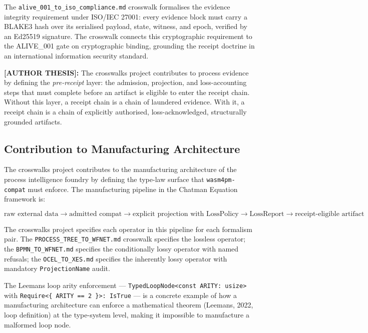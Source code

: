The \texttt{alive\_001\_to\_iso\_compliance.md} crosswalk formalises the evidence integrity
requirement under \textsc{ISO/IEC} 27001: every evidence block must carry a \textsc{BLAKE3}
hash over its serialised payload, state, witness, and epoch, verified by an Ed25519 signature.
The crosswalk connects this cryptographic requirement to the \textsc{ALIVE\_001} gate on
cryptographic binding, grounding the receipt doctrine in an international information security
standard.

\textbf{[AUTHOR THESIS]:} The crosswalks project contributes to process evidence by defining
the \emph{pre-receipt} layer: the admission, projection, and loss-accounting steps that must
complete before an artifact is eligible to enter the receipt chain. Without this layer, a
receipt chain is a chain of laundered evidence. With it, a receipt chain is a chain of
explicitly authorised, loss-acknowledged, structurally grounded artifacts.

\subsection{Contribution to Manufacturing Architecture}
\label{sec:crosswalks-contribution-manufacturing}

The crosswalks project contributes to the manufacturing architecture of the process intelligence
foundry by defining the type-law surface that \texttt{wasm4pm-compat} must enforce. The
manufacturing pipeline in the Chatman Equation framework is:

\[
  \text{raw external data}
  \to \text{admitted compat}
  \to \text{explicit projection with LossPolicy}
  \to \text{LossReport}
  \to \text{receipt-eligible artifact}
\]

The crosswalks project specifies each operator in this pipeline for each formalism pair. The
\texttt{PROCESS\_TREE\_TO\_WFNET.md} crosswalk specifies the lossless operator; the
\texttt{BPMN\_TO\_WFNET.md} specifies the conditionally lossy operator with named refusals;
the \texttt{OCEL\_TO\_XES.md} specifies the inherently lossy operator with mandatory
\texttt{ProjectionName} audit.

The Leemans loop arity enforcement --- \texttt{TypedLoopNode<const ARITY: usize>} with
\texttt{Require<\{ ARITY == 2 \}>: IsTrue} --- is a concrete example of how a manufacturing
architecture can enforce a mathematical theorem (Leemans, 2022, loop definition) at the
type-system level, making it impossible to manufacture a malformed loop node.

